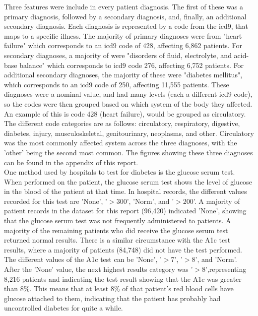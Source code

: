\documentclass{neu_handout}
\begin{document}
Three features were include in every patient diagnosis. The first of these was a primary diagnosis, followed by a secondary diagnosis, and, finally, an additional secondary diagnosis. Each diagnosis is represented by a code from the icd9, that maps to a specific illness. The majority of primary diagnoses were from "heart failure" which corresponds to an icd9 code of 428, affecting 6,862 patients. For secondary diagnoses, a majority of were "disorders of fluid, electrolyte, and acid-base balance" which corresponds to icd9 code 276, affecting 6,752 patients. For additional secondary diagnoses, the majority of these were "diabetes mellitus", which corresponds to an icd9 code of 250, affecting 11,555 patients. These diagnoses were a nominal value, and had many levels (each a different icd9 code), so the codes were then grouped based on which system of the body they affected. An example of this is code 428 (heart failure), would be grouped as circulatory. The different code categories are as follows: circulatory, respiratory, digestive, diabetes, injury, musculoskeletal, genitourinary, neoplasms, and other. Circulatory was the most commonly affected system across the three diagnoses, with the 'other' being the second most common. The figures showing these three diagnoses can be found in the appendix of this report. \\

One method used by hospitals to test for diabetes is the glucose serum test. When performed on the patient, the glucose serum test shows the level of glucose in the blood of the patient at that time. In hospital records, the different values recorded for this test are 'None', '$>$300', 'Norm', and '$>$200'. A majority of patient records in the dataset for this report (96,420) indicated 'None', showing that the glucose serum test was not frequently administered to patients. A majority of the remaining patients who did receive the glucose serum test returned normal results. There is a similar circumstance with the A1c test results, where a majority of patients (84,748) did not have the test performed. The different values of the A1c test can be 'None', '$>$7', '$>$8', and 'Norm'. After the 'None' value, the next highest results category was '$>$8',representing 8,216 patients and indicating the test result showing that the A1c was greater than $8 \% $. This means that at least $ 8 \% $ of that patient's red blood cells have glucose attached to them, indicating that the patient has probably had uncontrolled diabetes for quite a while.  \\
\end{document}
